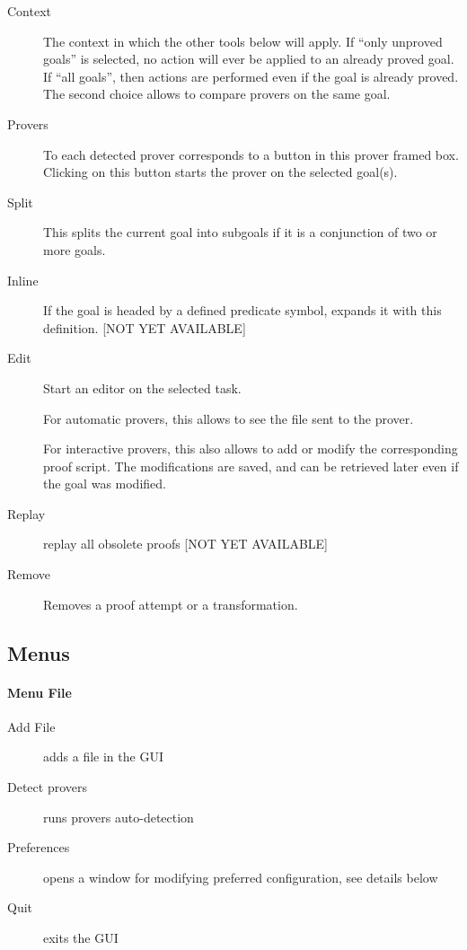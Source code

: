 \begin{description}
\item[Context] The context in which the other tools below will
  apply. If ``only unproved goals'' is selected, no action will ever
  be applied to an already proved goal.  If ``all goals'', then
  actions are performed even if the goal is already proved. The second
  choice allows to compare provers on the same goal.

\item[Provers] To each detected prover corresponds to a button in this
  prover framed box. Clicking on this button starts the prover on the
  selected goal(s).

\item[Split] This splits the current goal into subgoals if it is a
  conjunction of two or more goals.

\item[Inline] If the goal is headed by a defined predicate symbol,
  expands it with this definition. [NOT YET AVAILABLE]

\item[Edit] Start an editor on the selected task.

  For automatic provers, this allows to see the file sent to the
  prover.

  For interactive provers, this also allows to add or modify the
  corresponding proof script. The modifications are saved, and can be
  retrieved later even if the goal was modified.

\item[Replay] replay all obsolete proofs [NOT YET AVAILABLE]

\item[Remove] Removes a proof attempt or a transformation. 

\end{description}

\subsection{Menus}

\paragraph{Menu \textsf{File}}
\begin{description}
\item[Add File] adds a file in the GUI
\item[Detect provers] runs provers auto-detection
\item[Preferences] opens a window for modifying preferred
  configuration, see details below
\item[Quit] exits the GUI
\end{description}


